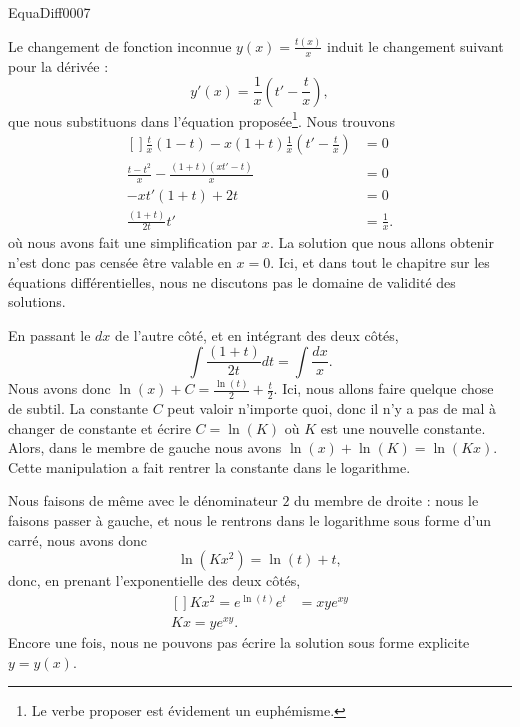 \begin{corrige}{EquaDiff0007}

Le changement de fonction inconnue $y(x)=\frac{ t(x) }{ x }$ induit le changement suivant pour la dérivée :
\begin{equation}
	y'(x)=\frac{1}{ x }\left( t'-\frac{ t }{ x } \right),
\end{equation}
que nous substituons dans l'équation proposée\footnote{Le verbe \og proposer\fg{} est évidement un euphémisme.}. Nous trouvons
\begin{equation}
	\begin{aligned}[]
		\frac{ t }{ x }(1-t)-x(1+t)\frac{1}{ x }\left( t'-\frac{ t }{ x } \right)&=0\\
		\frac{ t-t^2 }{ x }-\frac{ (1+t)(xt'-t) }{ x }&=0\\
		-xt'(1+t)+2t&=0\\
		\frac{ (1+t) }{ 2t }t'&=\frac{1}{ x }.
	\end{aligned}
\end{equation}
où nous avons fait une simplification par $x$. La solution que nous allons obtenir n'est donc pas censée être valable en $x=0$. Ici, et dans tout le chapitre sur les équations différentielles, nous ne discutons pas le domaine de validité des solutions.

En passant le $dx$ de l'autre côté, et en intégrant des deux côtés,
\begin{equation}
	\int\frac{ (1+t) }{ 2t }dt=\int \frac{ dx }{ x }.
\end{equation}
Nous avons donc $\ln(x)+C=\frac{ \ln(t) }{ 2 }+\frac{ t }{2}$. Ici, nous allons faire quelque chose de subtil. La constante $C$ peut valoir n'importe quoi, donc il n'y a pas de mal à changer de constante et écrire $C=\ln(K)$ où $K$ est une nouvelle constante. Alors, dans le membre de gauche nous avons $\ln(x)+\ln(K)=\ln(Kx)$. Cette manipulation a fait \og rentrer\fg{} la constante dans le logarithme.

Nous faisons de même avec le dénominateur $2$ du membre de droite : nous le faisons passer à gauche, et nous le rentrons dans le logarithme sous forme d'un carré, nous avons donc
\begin{equation}
	\ln(Kx^2)= \ln(t)+t,
\end{equation}
donc, en prenant l'exponentielle des deux côtés,
\begin{equation}
	\begin{aligned}[]
		Kx^2= e^{\ln(t)} e^{t}&=xye^{xy}\\
		Kx=y e^{xy}.
	\end{aligned}
\end{equation}
Encore une fois, nous ne pouvons pas écrire la solution sous forme explicite $y=y(x)$.

\end{corrige}

